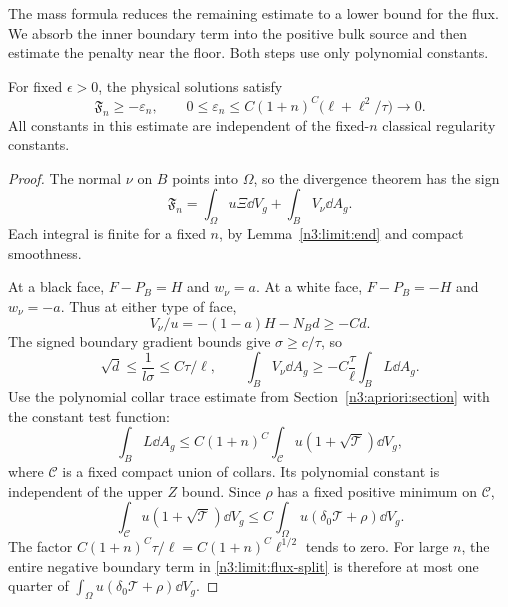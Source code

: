 The mass formula reduces the remaining estimate to a lower bound for
the flux. We absorb the inner boundary term into the positive bulk
source and then estimate the penalty near the floor. Both steps use
only polynomial constants.

\begin{lemma}\label{n3:limit:flux}
For fixed \(\epsilon>0\), the physical solutions satisfy
\[
 \mathfrak F_n\ge-\varepsilon_n,\qquad
 0\le\varepsilon_n\le
      C(1+n)^C\bigl(\ell+\ell^2/\tau\bigr)\longrightarrow0.
\]
All constants in this estimate are independent of the fixed-\(n\)
classical regularity constants.
\end{lemma}

\begin{proof}
The normal \(\nu\) on \(B\) points into \(\Omega\), so the divergence
theorem has the sign
\begin{equation}\label{n3:limit:flux-split}
 \mathfrak F_n
     =\int_\Omega u\Xi\dd V_g+\int_BV_\nu\dd A_g.
\end{equation}
Each integral is finite for a fixed \(n\), by
Lemma~\ref{n3:limit:end} and compact smoothness.

At a black face, \(F-P_B=H\) and \(w_\nu=a\).
At a white face, \(F-P_B=-H\) and \(w_\nu=-a\).
Thus at either type of face,
\[
                 V_\nu/u=-(1-a)H-N_Bd\ge-Cd.
\]
The signed boundary gradient bounds give
\(\sigma\ge c/\tau\), so
\[
 \sqrt d\le\frac1{l\sigma}\le C\tau/\ell,\qquad
 \int_BV_\nu\dd A_g\ge
             -C\frac{\tau}{\ell}\int_BL\dd A_g.
\]
Use the polynomial collar trace estimate from
Section~\ref{n3:apriori:section} with the constant test function:
\[
 \int_B L\dd A_g
    \le C(1+n)^C
       \int_{\mathcal C}u(1+\sqrt{\mathcal T})\dd V_g,
\]
where \(\mathcal C\) is a fixed compact union of collars.
Its polynomial constant is independent of the upper \(Z\) bound.
Since \(\rho\) has a fixed positive minimum on \(\mathcal C\),
\[
 \int_{\mathcal C}u(1+\sqrt{\mathcal T})\dd V_g
 \le C\int_\Omega u(\delta_0\mathcal T+\rho)\dd V_g.
\]
The factor \(C(1+n)^C\tau/\ell
=C(1+n)^C\ell^{1/2}\) tends to zero.
For large \(n\), the entire negative boundary term in
\eqref{n3:limit:flux-split} is therefore at most one quarter of
\(\int_\Omega u(\delta_0\mathcal T+\rho)\dd V_g\).


\end{proof}
